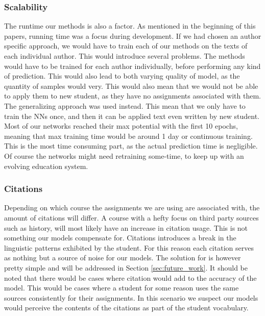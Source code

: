 %
\subsubsection{Scalability}

The runtime our methods is also a factor. As mentioned in the beginning of this
papers, running time was a focus during development. If we had chosen an author
specific approach, we would have to train each of our methods on the texts of
each individual author. This would introduce several problems. The methods
would have to be trained for each author individually, before performing any
kind of prediction. This would also lead to both varying quality of model, as
the quantity of samples would very. This would also mean that we would not be
able to apply them to new student, as they have no assignments associated with
them. The generalizing approach was used instead. This mean that we only have
to train the \glspl{NN} once, and then it can be applied text even written by
new student. Most of our networks reached their max potential with the first
10 epochs, meaning that max training time would be around 1 day or continuous
training. This is the most time consuming part, as the actual prediction time is
negligible. Of course the networks might need retraining some-time, to keep up
with an evolving education system.


\subsubsection{Citations}

Depending on which course the assignments we are using are associated with, the
amount of citations will differ. A course with a hefty focus on third party
sources such as history, will most likely have an increase in citation usage.
This is not something our models compensate for. Citations introduces a break in
the linguistic patterns exhibited by the student. For this reason each citation
serves as nothing but a source of noise for our models. The solution for is
however pretty simple and will be addressed in Section \ref{sec:future_work}.
It should be noted that there would be cases where citation would add to the
accuracy of the model. This would be cases where a student for some reason uses
the same sources consistently for their assignments. In this scenario we suspect
our models would perceive the contents of the citations as part of the student
vocabulary.


